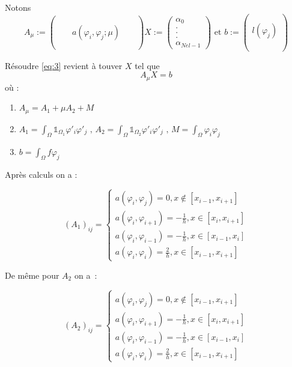 \documentclass[12pt]{article}
\begin{document}
\noindent Notons 
$$
A_{\mu} := \begin{pmatrix}
 &  &  & & \\
 &  &  &  & \\
 &  &  a(\varphi_{i},\varphi_{j};\mu)  &  & \\
  &  &  & & \\
 &  &  & &
\end{pmatrix} 
X :=\begin{pmatrix}
 \alpha_0   \\
 .  \\
 . \\
 . \\
\alpha_{Nel-1} 
\end{pmatrix} \text{ et } b := \begin{pmatrix}
\\
\\
l(\varphi_{j}) \\
\\

\\
\end{pmatrix}
$$

\noindent Résoudre \eqref{eq:3} revient à touver $X$ tel que $$ A_{\mu}X=b$$
où :
\begin{enumerate}
    \item $A_{\mu} = A_{1} + \mu A_{2} + M $  
    \item $A_{1} = \int_{\Omega} \mathbb{1}_{\Omega_{1}} \varphi'_{i} \varphi'_{j}    \text{ ,  } A_{2} = \int_{\Omega} \mathbb{1}_{\Omega_{2}} \varphi'_{i} \varphi'_{j} \text{  ,  }  M = \int_{\Omega} \varphi_{i} \varphi_{j}$
    \item  $ b = \int_{\Omega} f \varphi_{j}$
\end{enumerate}

\noindent Après calculs on a :

$$
(A_{1})_{ij} = 
\begin{cases}
a(\varphi_{i}, \varphi_{j}) = 0, x \notin [x_{i-1}, x_{i+1}] \\
a(\varphi_{i}, \varphi_{i+1}) = -\frac{1}{h}, x \in [x_{i}, x_{i+1}] \\
a(\varphi_{i}, \varphi_{i-1}) = -\frac{1}{h}, x \in [x_{i-1}, x_{i}] \\
a(\varphi_{i}, \varphi_{i}) = \frac{2}{h}, x \in [x_{i-1}, x_{i+1}] 
\end{cases}
$$

\noindent De même pour $ A_{2} $ on a :

$$
(A_{2})_{ij} = 
\begin{cases}
a(\varphi_{i}, \varphi_{j}) = 0, x \notin [x_{i-1}, x_{i+1}] \\
a(\varphi_{i}, \varphi_{i+1}) = -\frac{1}{h}, x \in [x_{i}, x_{i+1}] \\
a(\varphi_{i}, \varphi_{i-1}) = -\frac{1}{h}, x \in [x_{i-1}, x_{i}] \\
a(\varphi_{i}, \varphi_{i}) = \frac{2}{h}, x \in [x_{i-1}, x_{i+1}] 
\end{cases}
$$
\end{document}
